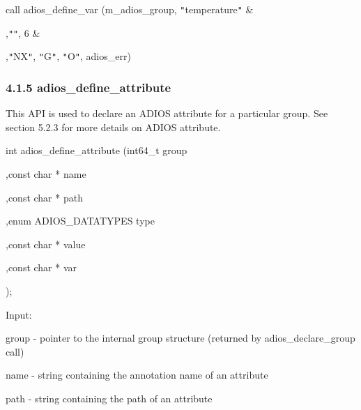 \vspace{10pt}
\leftskip=40pt
\parindent=3pt
call adios\_define\_var (m\_adios\_group, \texttt{"}temperature\texttt{"} \&

\vspace{10pt}
\parindent=93pt
,\texttt{"}\texttt{"}, 6 \&

\vspace{10pt}
,\texttt{"}NX\texttt{"}, \texttt{"}G\texttt{"}, \texttt{"}O\texttt{"}, adios\_err)\label{HToc182553360}

\vspace{10pt}
\subsubsection*{{\large \textbf{4.1.5 adios\_define\_attribute}}}

\vspace{10pt}
\leftskip=0pt
\parindent=0pt
This API is used to declare an ADIOS attribute for a particular group. See section 
5.2.3 for more details on ADIOS attribute.

\vspace{10pt}
\leftskip=22pt
int adios\_define\_attribute (int64\_t group

\vspace{10pt}
\parindent=187pt
,const char * name

\vspace{10pt}
,const char * path

\vspace{10pt}
\parindent=374pt
,enum ADIOS\_DATATYPES type

\vspace{10pt}
\parindent=187pt
,const char * value

\vspace{10pt}
,const char * var

\vspace{10pt}
\parindent=374pt
);

\vspace{10pt}
\parindent=0pt
Input:

\vspace{10pt}
\leftskip=45pt
group - pointer to the internal group structure (returned by adios\_declare\_group 
call)

\vspace{10pt}
\leftskip=117pt
\parindent=-72pt
name - string containing the annotation name of an attribute

\vspace{10pt}
\leftskip=45pt
\parindent=0pt
path - string containing the path of an attribute

